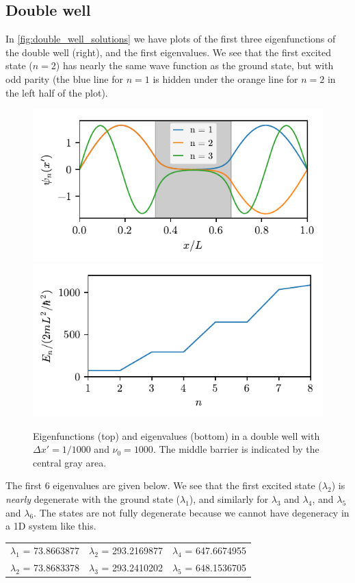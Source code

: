 \subsection*{Double well}
In \cref{fig:double_well_solutions} we have plots of the first three eigenfunctions of the double well (right), and the first eigenvalues. We see that the first excited state ($n=2$) has nearly the same wave function as the ground state, but with odd parity (the blue line for $n=1$ is hidden under the orange line for $n=2$ in the left half of the plot).
\begin{figure}[ht!]%
\centering%
\includegraphics{figs/double_eigenfunctions.pdf}\\%
\includegraphics{figs/double_eigenvalues.pdf}%
\caption{Eigenfunctions (top) and eigenvalues (bottom) in a double well with $\Delta x' = 1/1000$ and $\nu_0 = 1000$. The middle barrier is indicated by the central gray area. \label{fig:well_solutions}}%
\end{figure}

The first 6 eigenvalues are given below. We see that the first excited state ($\lambda_2$) is \emph{nearly} degenerate with the ground state ($\lambda_1$), and similarly for $\lambda_3$ and $\lambda_4$, and $\lambda_5$ and $\lambda_6$. The states are not fully degenerate because we cannot have degeneracy in a 1D system like this.
\begin{center}
\begin{tabular}{ccc}
$\lambda_1$ = 73.8663877 & $\lambda_2$ = 293.2169877 & $\lambda_4$ = 647.6674955 \\
$\lambda_2$ = 73.8683378 & $\lambda_3$ = 293.2410202 & $\lambda_5$ = 648.1536705
\end{tabular}
\end{center}

